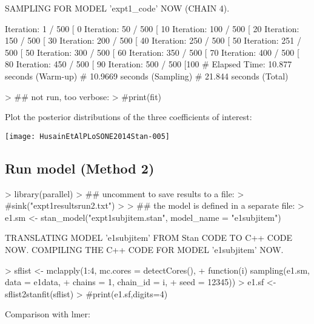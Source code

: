 \documentclass{article}
\begin{document}
\begin{Schunk}
\begin{Soutput}
SAMPLING FOR MODEL 'expt1_code' NOW (CHAIN 4).

Iteration:   1 / 500 [  0%]  (Warmup)
Iteration:  50 / 500 [ 10%]  (Warmup)
Iteration: 100 / 500 [ 20%]  (Warmup)
Iteration: 150 / 500 [ 30%]  (Warmup)
Iteration: 200 / 500 [ 40%]  (Warmup)
Iteration: 250 / 500 [ 50%]  (Warmup)
Iteration: 251 / 500 [ 50%]  (Sampling)
Iteration: 300 / 500 [ 60%]  (Sampling)
Iteration: 350 / 500 [ 70%]  (Sampling)
Iteration: 400 / 500 [ 80%]  (Sampling)
Iteration: 450 / 500 [ 90%]  (Sampling)
Iteration: 500 / 500 [100%]  (Sampling)
#  Elapsed Time: 10.877 seconds (Warm-up)
#                10.9669 seconds (Sampling)
#                21.844 seconds (Total)
\end{Soutput}
\begin{Sinput}
> ## not run, too verbose:
> #print(fit)
\end{Sinput}
\end{Schunk}

Plot the posterior distributions of the three coefficients of interest:

\texttt{[image: HusainEtAlPLoSONE2014Stan-005]}

\subsection{Run model (Method 2)}

\begin{Schunk}
\begin{Sinput}
> library(parallel)
> ## uncomment to save results to a file:
> #sink("expt1resultsrun2.txt")
> 
> ## the model is defined in a separate file:
> e1.sm <- stan_model("expt1subjitem.stan", model_name = "e1subjitem")
\end{Sinput}
\begin{Soutput}
TRANSLATING MODEL 'e1subjitem' FROM Stan CODE TO C++ CODE NOW.
COMPILING THE C++ CODE FOR MODEL 'e1subjitem' NOW.
\end{Soutput}
\begin{Sinput}
> sflist <- mclapply(1:4, mc.cores = detectCores(),
+                    function(i) sampling(e1.sm, data = e1data,
+                                         chains = 1, chain_id = i, 
+                                         seed = 12345))
> e1.sf <- sflist2stanfit(sflist)
> #print(e1.sf,digits=4)
\end{Sinput}
\end{Schunk}

Comparison with lmer:
\end{document}
